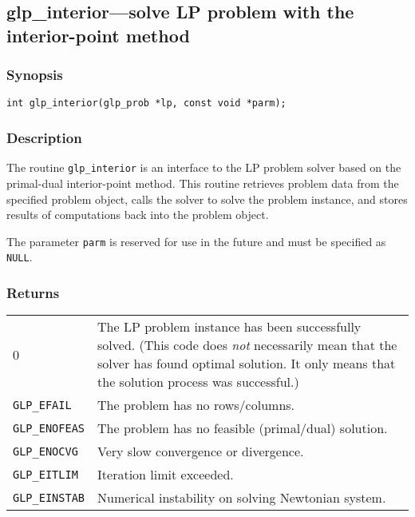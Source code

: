 \subsection{glp\_interior---solve LP problem with the interior-point
method}

\subsubsection*{Synopsis}

\begin{verbatim}
int glp_interior(glp_prob *lp, const void *parm);
\end{verbatim}

\subsubsection*{Description}

The routine \verb|glp_interior| is an interface to the LP problem
solver based on the primal-dual interior-point method. This routine
retrieves problem data from the specified problem object, calls the
solver to solve the problem instance, and stores results of computations
back into the problem object.

The parameter \verb|parm| is reserved for use in the future and must be
specified as \verb|NULL|.

\subsubsection*{Returns}

\def\arraystretch{1}

\begin{tabular}{@{}p{25mm}p{97.3mm}@{}}
0 & The LP problem instance has been successfully solved. (This code
does {\it not} necessarily mean that the solver has found optimal
solution. It only means that the solution process was successful.) \\
\verb|GLP_EFAIL| & The problem has no rows/columns.\\
\verb|GLP_ENOFEAS| & The problem has no feasible (primal/dual)
solution.\\
\verb|GLP_ENOCVG| & Very slow convergence or divergence.\\
\verb|GLP_EITLIM| & Iteration limit exceeded.\\
\verb|GLP_EINSTAB| & Numerical instability on solving Newtonian
system.\\
\end{tabular}

